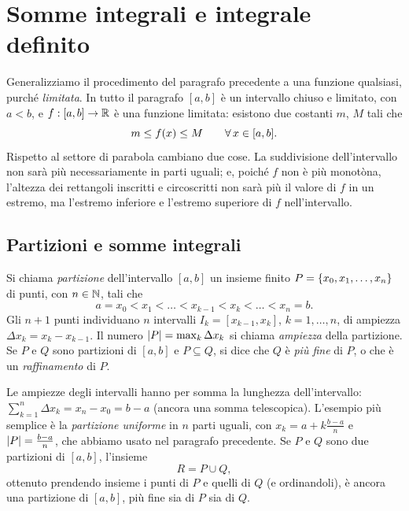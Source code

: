 \section{Somme integrali e integrale definito}
\label{sec:integrale-definito}

Generalizziamo il procedimento del paragrafo precedente a una funzione qualsiasi,
purché \emph{limitata}. In tutto il paragrafo $[a,b]$ è un intervallo chiuso e limitato,
con $a<b$, e $f:[a,b]\to\mathbb{R}$ è una funzione limitata: esistono due costanti $m$, $M$ tali
che
\begin{equation}\label{eq:f-limitata}
  m\le f(x)\le M \qquad\forall\, x\in[a,b] .
\end{equation}
Rispetto al settore di parabola cambiano due cose. La suddivisione dell'intervallo non
sarà più necessariamente in parti uguali; e, poiché $f$ non è più monotòna, l'altezza
dei rettangoli inscritti e circoscritti non sarà più il valore di $f$ in un estremo,
ma l'estremo inferiore e l'estremo superiore di $f$ nell'intervallo.

\subsection{Partizioni e somme integrali}

\begin{definizione}[Partizione]\label{def:partizione}
Si chiama \emph{partizione} dell'intervallo $[a,b]$ un insieme finito
$P=\left\{ x_{0},x_{1},\dots,x_{n} \right\}$ di punti, con $n\in\mathbb{N}$, tali che
\begin{equation}\label{eq:partizione}
  a=x_{0}<x_{1}<\dots<x_{k-1}<x_{k}<\dots<x_{n}=b .
\end{equation}
Gli $n+1$ punti individuano $n$ intervalli $I_{k}=[x_{k-1},x_{k}]$, $k=1,\dots,n$, di
ampiezza $\Delta x_{k}=x_{k}-x_{k-1}$. Il numero $\lvert P\rvert=\max_{k}\Delta x_{k}$ si chiama
\emph{ampiezza} della partizione. Se $P$ e $Q$ sono partizioni di $[a,b]$ e
$P\subseteq Q$, si dice che $Q$ è \emph{più fine} di $P$, o che è un
\emph{raffinamento} di $P$.
\end{definizione}

Le ampiezze degli intervalli hanno per somma la lunghezza dell'intervallo:
$\sum_{k=1}^{n}\Delta x_{k}=x_{n}-x_{0}=b-a$ (ancora una somma telescopica). L'esempio
più semplice è la \emph{partizione uniforme} in $n$ parti uguali, con
$x_{k}=a+k\frac{b-a}n$ e $\lvert P\rvert=\frac{b-a}n$, che abbiamo usato nel paragrafo
precedente. Se $P$ e $Q$ sono due partizioni di $[a,b]$, l'insieme
\begin{equation}\label{eq:unione-partizioni}
  R=P\cup Q ,
\end{equation}
ottenuto prendendo insieme i punti di $P$ e quelli di $Q$ (e ordinandoli), è ancora una
partizione di $[a,b]$, più fine sia di $P$ sia di $Q$.

